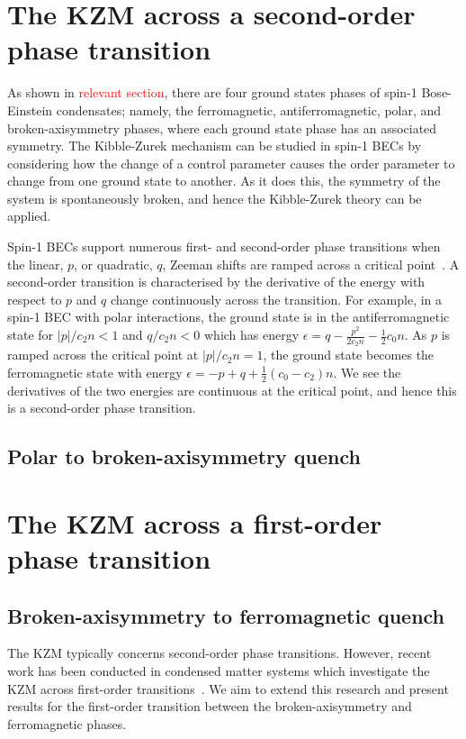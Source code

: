 \section{The KZM across a second-order phase transition}
As shown in \textcolor{red}{relevant section}, there are four ground states
phases of spin-1 Bose-Einstein condensates; namely, the ferromagnetic,
antiferromagnetic, polar, and broken-axisymmetry phases, where each ground
state phase has an associated symmetry.
The Kibble-Zurek mechanism can be studied in spin-1 BECs by considering how
the change of a control parameter causes the order parameter to change from 
one ground state to another.
As it does this, the symmetry of the system is spontaneously broken, and hence
the Kibble-Zurek theory can be applied.

Spin-1 BECs support numerous first- and second-order phase transitions
when the linear, $p$, or quadratic, $q$, Zeeman shifts are
ramped across a critical point~\cite{Kawaguchi2012}.
A second-order transition is characterised by the derivative of the energy with
respect to $p$ and $q$ change continuously across the transition.
For example, in a spin-1 BEC with polar interactions, the ground state is in
the antiferromagnetic state for $|p|/c_2n<1$ and $q/c_2n<0$ which has energy
$\epsilon = q - \frac{p^2}{2c_2n}-\frac{1}{2}c_0n$.
As $p$ is ramped across the critical point at $|p|/c_2n=1$, the ground state
becomes the ferromagnetic state with energy
$\epsilon = -p + q + \frac{1}{2}(c_0 - c_2)n$.
We see the derivatives of the two energies are continuous at the critical point,
and hence this is a second-order phase transition.

\subsection{Polar to broken-axisymmetry quench}

\section{The KZM across a first-order phase transition}
\subsection{Broken-axisymmetry to ferromagnetic quench}
The KZM typically concerns second-order phase transitions. However, recent
work has been conducted in condensed matter systems which investigate
the KZM across first-order transitions~\cite{Qiu2020}.
We aim to extend this research and present results for
the first-order transition between the broken-axisymmetry and
ferromagnetic phases.

